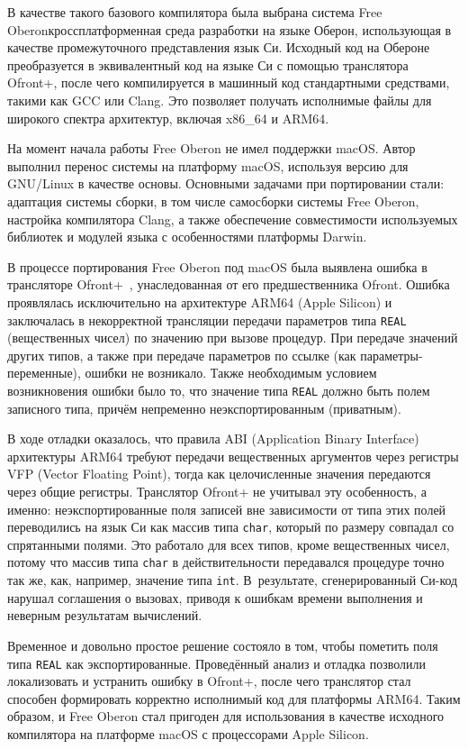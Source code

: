\documentclass[utf8]{lgu}
\newcommand{\tire}{\unskip\nobreak\thinspace\textemdash\thinspace}
\newcommand{\code}[1]{{\normalsize\texttt{#1}}}
\begin{document}
В качестве такого базового компилятора была выбрана система Free Oberon\tire кроссплатформенная среда разработки на языке Оберон, использующая в качестве промежуточного представления язык Си. Исходный код на Обероне преобразуется в эквивалентный код на языке Си с помощью транслятора Ofront+, после чего компилируется в машинный код стандартными средствами, такими как GCC или Clang. Это позволяет получать исполнимые файлы для широкого спектра архитектур, включая x86\_64 и ARM64.

На момент начала работы Free Oberon не имел поддержки macOS. Автор выполнил перенос системы на платформу macOS, используя версию для GNU/Linux в качестве основы. Основными задачами при портировании стали: адаптация системы сборки, в том числе самосборки системы Free Oberon, настройка компилятора Clang, а также обеспечение совместимости используемых библиотек и модулей языка с особенностями платформы Darwin.

В процессе портирования Free Oberon под macOS была выявлена ошибка в трансляторе Ofront+~\cite{OfrontPlusBug}, унаследованная от его предшественника Ofront. Ошибка проявлялась исключительно на архитектуре ARM64 (Apple Silicon) и заключалась в некорректной трансляции передачи параметров типа \code{REAL} (вещественных чисел) по значению при вызове процедур. При передаче значений других типов, а также при передаче параметров по ссылке (как параметры-переменные), ошибки не возникало. Также необходимым условием возникновения ошибки было то, что значение типа \code{REAL} должно быть полем записного типа, причём непременно неэкспортированным (приватным).

В ходе отладки оказалось, что правила ABI (Application Binary Interface) архитектуры ARM64 требуют передачи вещественных аргументов через регистры VFP (Vector Floating Point), тогда как целочисленные значения передаются через общие регистры. Транслятор Ofront+ не учитывал эту особенность, а именно: неэкспортированные поля записей вне зависимости от типа этих полей переводились на язык Си как массив типа \code{char}, который по размеру совпадал со спрятанными полями. Это работало для всех типов, кроме вещественных чисел, потому что массив типа \code{char} в действительности передавался процедуре точно так же, как, например, значение типа \code{int}. В~результате, сгенерированный Си-код нарушал соглашения о вызовах, приводя к ошибкам времени выполнения и неверным результатам вычислений.

Временное и довольно простое решение состояло в том, чтобы пометить поля типа \code{REAL} как экспортированные. Проведённый анализ и отладка позволили локализовать и устранить ошибку в Ofront+, после чего транслятор стал способен формировать корректно исполнимый код для платформы ARM64. Таким образом, и Free Oberon стал пригоден для использования в качестве исходного компилятора на платформе macOS с процессорами Apple Silicon.
\end{document}
